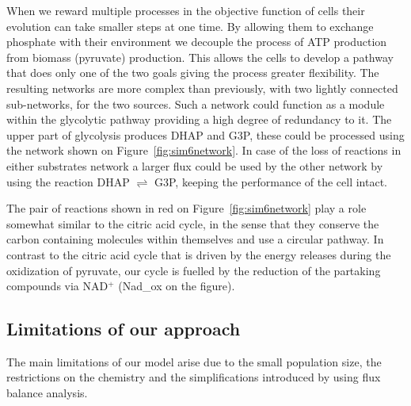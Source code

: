 \documentclass[a4paper,12pt]{article}
\begin{document}



When we reward multiple processes in the objective function of cells their evolution can take smaller steps at one time. By allowing them to exchange phosphate with their environment we decouple the process of ATP production from biomass (pyruvate) production. This allows the cells to develop a pathway that does only one of the two goals giving the process greater flexibility. The resulting networks are more complex than previously, with two lightly connected sub-networks, for the two sources. Such a network could function as a module within the glycolytic pathway providing a high degree of redundancy to it. The upper part of glycolysis produces DHAP and G3P, these could be processed using the network shown on Figure~\ref{fig:sim6network}. In case of the loss of reactions in either substrates network a larger flux could be used by the other network by using the reaction DHAP $\rightleftharpoons$ G3P, keeping the performance of the cell intact. 

The pair of reactions shown in red on Figure~\ref{fig:sim6network} play a role somewhat similar to the 
citric acid cycle, in the sense that they conserve the carbon containing molecules within themselves and use a circular pathway. In contrast to the citric acid cycle that is driven by the energy releases during the oxidization of pyruvate, our cycle is fuelled by the reduction of the partaking compounds via NAD$^+$ (Nad\_ox on the figure). 

\subsection{Limitations of our approach}
\label{sub:limitations}


The main limitations of our model arise due to the small population size, the restrictions on the chemistry and the simplifications introduced by using flux balance analysis. 
\end{document}
